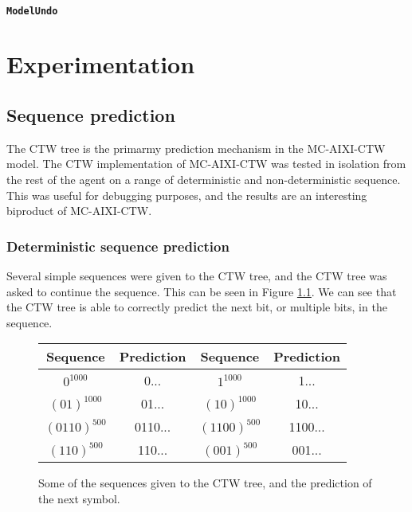 \documentclass[pdftex,twoside,a4paper]{report}
\newcommand{\bcen}{\begin{center}}
\newcommand{\ecen}{\end{center}}
\newcommand{\mac}{MC-AIXI-CTW}
\begin{document}
\subsubsection{\texttt{ModelUndo}}


\chapter{Experimentation}
\section{Sequence prediction}
\label{sec:Sequence prediction}
The CTW tree is the primarmy prediction mechanism in the \mac{} model. The CTW implementation of \mac{} was tested in isolation from the rest of the agent on a range of deterministic and non-deterministic sequence. This was useful for debugging purposes, and the results are an interesting biproduct of \mac{}.
\subsection{Deterministic sequence prediction}
Several simple sequences were given to the CTW tree, and the CTW tree was asked to continue the sequence. This can be seen in Figure \ref{tab:det_seq_pred}. We can see that the CTW tree is able to correctly predict the next bit, or multiple bits, in the sequence.

\begin{figure}
\bcen
\bgroup
\def\arraystretch{1.5}
\begin{tabular}{|cc|cc|}
\hline
Sequence & Prediction & Sequence & Prediction\\
\hline $0^{1000}$ & 0... & $1^{1000}$ & 1...\\ 
\hline $(01)^{1000}$ & 01... & $(10)^{1000}$ & 10...\\ 
\hline $(0110)^{500}$ & 0110... & $(1100)^{500}$ & 1100...\\ 
\hline $(110)^{500}$ & 110... & $(001)^{500}$ & 001...\\
\hline 
\end{tabular} 
\egroup
\ecen
\caption{Some of the sequences given to the CTW tree, and the prediction of the next symbol.}
\label{tab:det_seq_pred}
\end{figure}
\end{document}

